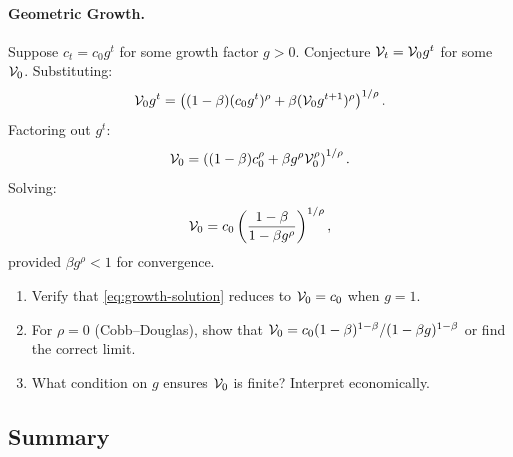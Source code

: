 \paragraph{Geometric Growth.}
Suppose $c_t = c_0 g^t$ for some growth factor $g > 0$. Conjecture $\mathcal{V}_t = \mathcal{V}_0 g^t$ for some $\mathcal{V}_0$. Substituting:
\begin{equation}
\mathcal{V}_0 g^t = \left( (1-\beta) (c_0 g^t)^\rho + \beta (\mathcal{V}_0 g^{t+1})^\rho \right)^{1/\rho}.
\label{eq:growth-substitution}
\end{equation}
Factoring out $g^t$:
\begin{equation}
\mathcal{V}_0 = \left( (1-\beta) c_0^\rho + \beta g^\rho \mathcal{V}_0^\rho \right)^{1/\rho}.
\label{eq:growth-simplified}
\end{equation}
Solving:
\begin{equation}
\mathcal{V}_0 = c_0 \left( \frac{1-\beta}{1 - \beta g^\rho} \right)^{1/\rho},
\label{eq:growth-solution}
\end{equation}
provided $\beta g^\rho < 1$ for convergence.

\begin{callouttip}[Exercise]
\begin{enumerate}[label=(\alph*), leftmargin=1.5em]
    \item Verify that \cref{eq:growth-solution} reduces to $\mathcal{V}_0 = c_0$ when $g = 1$.
    \item For $\rho = 0$ (Cobb--Douglas), show that $\mathcal{V}_0 = c_0 (1-\beta)^{1-\beta} / (1 - \beta g)^{1-\beta}$ or find the correct limit.
    \item What condition on $g$ ensures $\mathcal{V}_0$ is finite? Interpret economically.
\end{enumerate}
\end{callouttip}

\subsection{Summary}
\label{subsec:fixed-point-summary}

